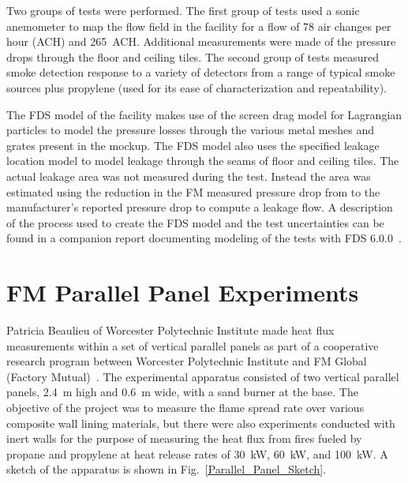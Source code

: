 Two groups of tests were performed. The first group of tests used a sonic anemometer to map the flow field in the facility for a flow of 78 air changes per hour (ACH) and 265~ACH. Additional measurements were made of the pressure drops through the floor and ceiling tiles. The second group of tests measured smoke detection response to a variety of detectors from a range of typical smoke sources plus propylene (used for its ease of characterization and repeatability).

The FDS model of the facility makes use of the screen drag model for Lagrangian particles to model the pressure losses through the various metal meshes and grates present in the mockup. The FDS model also uses the specified leakage location model to model leakage through the seams of floor and ceiling tiles. The actual leakage area was not measured during the test. Instead the area was estimated using the reduction in the FM measured pressure drop from to the manufacturer's reported pressure drop to compute a leakage flow. A description of the process used to create the FDS model and the test uncertainties can be found in a companion report documenting modeling of the tests with FDS 6.0.0~\cite{FDS_Datacenter_Rpt}.


\section{FM Parallel Panel Experiments}
\label{FM_Parallel_Panel_Description}

Patricia Beaulieu of Worcester Polytechnic Institute made heat flux measurements within a set of vertical parallel panels as part of a cooperative research program between Worcester Polytechnic Institute and FM Global (Factory Mutual)~\cite{Beaulieu:FM}. The experimental apparatus consisted of two vertical parallel panels, 2.4~m high and 0.6~m wide, with a sand burner at the base. The objective of the project was to measure the flame spread rate over various composite wall lining materials, but there were also experiments conducted with inert walls for the purpose of measuring the heat flux from fires fueled by propane and propylene at heat release rates of 30~kW, 60~kW, and 100~kW. A sketch of the apparatus is shown in Fig.~\ref{Parallel_Panel_Sketch}.

